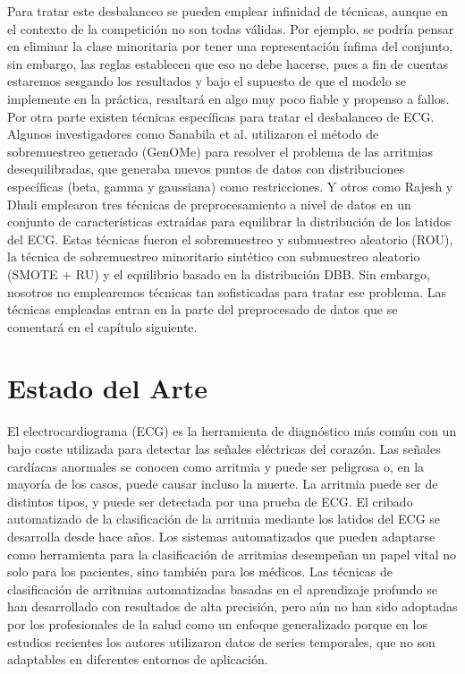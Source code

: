         Para tratar este desbalanceo se pueden emplear infinidad de técnicas, aunque en el contexto de la competición no son todas válidas. Por ejemplo, se podría pensar en eliminar la clase minoritaria por tener una representación ínfima del conjunto, sin embargo, las reglas establecen que eso no debe hacerse, pues a fin de cuentas estaremos sesgando los resultados y bajo el supuesto de que el modelo se implemente en la práctica, resultará en algo muy poco fiable y propenso a fallos. Por otra parte existen técnicas específicas para tratar el desbalanceo de ECG. Algunos investigadores como Sanabila et al. \cite{sanabila2016generative} utilizaron el método de sobremuestreo generado (GenOMe) para resolver el problema de las arritmias desequilibradas, que generaba nuevos puntos de datos con distribuciones específicas (beta, gamma y gaussiana) como restricciones. Y otros como Rajesh y Dhuli \cite{rajesh2018classification} emplearon tres técnicas de preprocesamiento a nivel de datos en un conjunto de características extraídas para equilibrar la distribución de los latidos del ECG. Estas técnicas fueron el sobremuestreo y submuestreo aleatorio (ROU), la técnica de sobremuestreo minoritario sintético con submuestreo aleatorio (SMOTE + RU) y el equilibrio basado en la distribución DBB. Sin embargo, nosotros no emplearemos técnicas tan sofisticadas para tratar ese problema. Las técnicas empleadas entran en la parte del preprocesado de datos que se comentará en el capítulo siguiente. \\
        
    

\section{Estado del Arte}

El electrocardiograma (ECG) es la herramienta de diagnóstico más común con un bajo coste utilizada para detectar las señales eléctricas del corazón. Las señales cardíacas anormales se conocen como arritmia y puede ser peligrosa o, en la mayoría de los casos, puede causar incluso la muerte. La arritmia puede ser de distintos tipos, y puede ser detectada por una prueba de ECG. El cribado automatizado de la clasiﬁcación de la arritmia mediante los latidos del ECG se desarrolla desde hace años. Los sistemas automatizados que pueden adaptarse como herramienta para la clasificación de arritmias desempeñan un papel vital no solo para los pacientes, sino también para los médicos. Las técnicas de clasificación de arritmias automatizadas basadas en el aprendizaje profundo se han desarrollado con resultados de alta precisión, pero aún no han sido adoptadas por los profesionales de la salud como un enfoque generalizado porque en los estudios recientes los autores utilizaron datos de series temporales, que no son adaptables en diferentes entornos de aplicación.  \\
    
